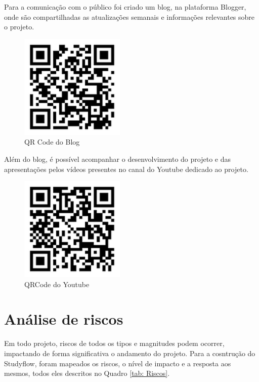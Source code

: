 Para a comunicação com o público foi criado um blog, na plataforma Blogger, onde são compartilhadas as atualizações semanais e informações relevantes sobre o projeto.

 \begin{figure}[!htb]
 	    \centering
 	    \caption{\label{logo}QR Code do Blog}
 	    \includegraphics[width=5cm]{img/qrcode-blog.png}
\end{figure}
\FloatBarrier

Além do blog, é possível acompanhar o desenvolvimento do projeto e das apresentações pelos vídeos presentes no canal do Youtube dedicado ao projeto.

 \begin{figure}[!htb]
 	    \centering
 	    \caption{\label{logo}QRCode do Youtube}
 	    \includegraphics[width=5cm]{img/qrcode-youtube.png}
\end{figure}
\FloatBarrier

\section{Análise de riscos}

Em todo projeto, riscos de todos os tipos e magnitudes podem ocorrer, impactando de forma significativa o andamento do projeto. 
Para a cosntrução do Studyflow, foram mapeados os riscos, o nível de impacto e a resposta aos mesmos, todos eles descritos no Quadro \ref{tab: Riscos}.

